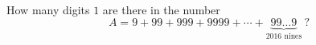 How many digits $1$ are there in the number
\[
A=9+99+999+9999+\cdots+\underbrace{99\ldots9}_{2016\text{ nines}}\ ?
\]
